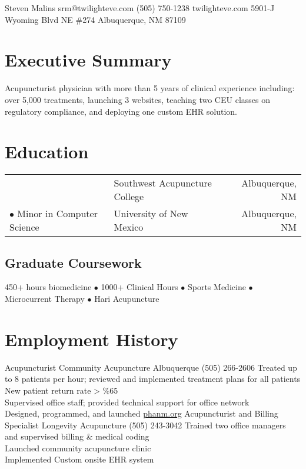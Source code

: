 \documentclass{myres}
\makeatletter
\newcommand{\myfname}{Steven}
\newcommand{\mylname}{Malins}
\newcommand{\myemail}{srm@twilighteve.com}
\newcommand{\myweb}{twilighteve.com}
\newcommand{\myphone}{(505) 750-1238}
\newcommand{\myaddressA}{5901-J Wyoming Blvd NE \#274}
\newcommand{\myaddressB}{Albuquerque, NM 87109}
\makeatother
\begin{document}
\pagestyle{empty}

\mktop
{\myfname}
{\mylname}
{\myemail}
{\myphone}
{\myweb}
{\myaddressA}
{\myaddressB}

\myendsec
\section{Executive Summary}
\vspace{-.5em}
Acupuncturist physician with more than 5 years of clinical experience including: over 5,000 treatments, launching 3 websites, teaching two CEU classes on regulatory compliance, and deploying one custom EHR solution.
\myendsec

\section{Education}
\vspace{-1em}
\begin{tabularx}{\textwidth}{@{} l l R}
 & Southwest Acupuncture College & Albuquerque, NM\\
 $\bullet$ Minor in Computer Science & University of New Mexico & Albuquerque, NM\\
\end{tabularx}
\vspace{-1em}
\subsection{Graduate Coursework}
\vspace{-.8em}
450+ hours biomedicine $\bullet$ 1000+ Clinical Hours $\bullet$ Sports Medicine $\bullet$ Microcurrent Therapy $\bullet$ Hari Acupuncture
\myendsec

\section{Employment History}
{Acupuncturist}
{Community Acupuncture Albuquerque}
{(505) 266-2606}
{
Treated up to 8 patients per hour; reviewed and implemented treatment plans for all patients\\
New patient return rate > \%65\\
Supervised office staff; provided technical support for office network\\
Designed, programmed, and launched \url{phanm.org}
}
{Acupuncturist and Billing Specialist}
{Longevity Acupuncture}
{(505) 243-3042}
{
Trained two office managers and supervised billing \& medical coding\\
Launched community acupuncture clinic\\
Implemented Custom onsite EHR system
}
\myendsec
\end{document}

